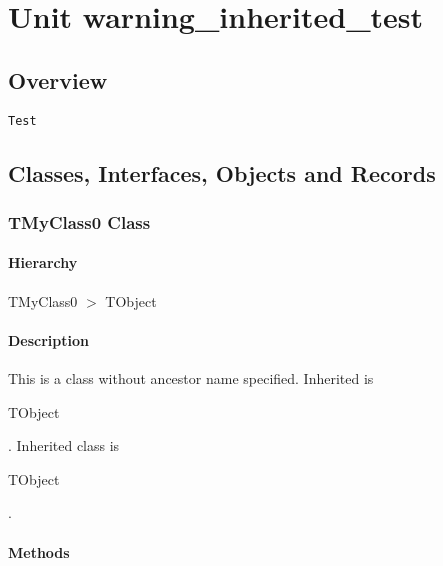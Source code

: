 \documentclass{report}
\newif\ifpdf
\begin{document}
\label{toc}\tableofcontents
\newpage
\newlength{\tmplength}
\chapter{Unit warning{\_}inherited{\_}test}
\label{warning_inherited_test}
\section{Overview}
\begin{description}
\item[\texttt{\begin{ttfamily}TMyClass0\end{ttfamily} Class}]
\item[\texttt{\begin{ttfamily}TMyClass1\end{ttfamily} Class}]
\item[\texttt{\begin{ttfamily}TMyClass2\end{ttfamily} Class}]
\end{description}
\begin{description}
\item[\texttt{Test}]
\end{description}
\section{Classes, Interfaces, Objects and Records}
\ifpdf
\subsection*{\large{\textbf{TMyClass0 Class}}\normalsize\hspace{1ex}\hrulefill}
\else
\subsection*{TMyClass0 Class}
\fi
\label{warning_inherited_test.TMyClass0}
\subsubsection*{\large{\textbf{Hierarchy}}\normalsize\hspace{1ex}\hfill}
TMyClass0 {$>$} TObject
\subsubsection*{\large{\textbf{Description}}\normalsize\hspace{1ex}\hfill}
This is a class without ancestor name specified. Inherited is \begin{ttfamily}TObject\end{ttfamily}. Inherited class is \begin{ttfamily}TObject\end{ttfamily}.\subsubsection*{\large{\textbf{Methods}}\normalsize\hspace{1ex}\hfill}
\end{document}

